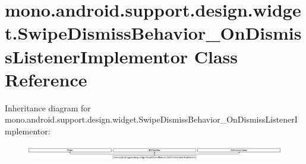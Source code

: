 \hypertarget{classmono_1_1android_1_1support_1_1design_1_1widget_1_1_swipe_dismiss_behavior___on_dismiss_listener_implementor}{}\section{mono.\+android.\+support.\+design.\+widget.\+Swipe\+Dismiss\+Behavior\+\_\+\+On\+Dismiss\+Listener\+Implementor Class Reference}
\label{classmono_1_1android_1_1support_1_1design_1_1widget_1_1_swipe_dismiss_behavior___on_dismiss_listener_implementor}
Inheritance diagram for mono.\+android.\+support.\+design.\+widget.\+Swipe\+Dismiss\+Behavior\+\_\+\+On\+Dismiss\+Listener\+Implementor\+:\begin{figure}[H]
\begin{center}
\leavevmode
\includegraphics[height=0.700438cm]{classmono_1_1android_1_1support_1_1design_1_1widget_1_1_swipe_dismiss_behavior___on_dismiss_listener_implementor}
\end{center}
\end{figure}

